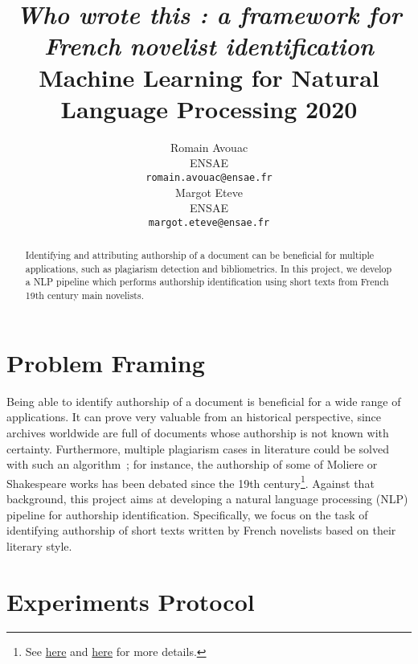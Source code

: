 \documentclass[11pt,a4paper]{article}
\title{\textit{Who wrote this : a framework for French novelist identification} \\
Machine Learning for Natural Language Processing 2020}
\author{Romain Avouac \\
  ENSAE  \\
  \texttt{romain.avouac@ensae.fr} \\\And
  Margot Eteve \\
  ENSAE \\
  \texttt{margot.eteve@ensae.fr} \\}
\date{}
\begin{document}
\maketitle



\begin{abstract}
Identifying and attributing authorship of a document can be beneficial for multiple applications, such as plagiarism detection and bibliometrics. In this project, we develop a NLP pipeline which performs authorship identification using short texts from French 19th century main novelists.
\end{abstract}

\section{Problem Framing}

Being able to identify authorship of a document is beneficial for a wide range of applications. It can prove very valuable from an historical perspective, since archives worldwide are full of documents whose authorship is not known with certainty. Furthermore, multiple plagiarism cases in literature could be solved with such an algorithm~; for instance, the authorship of some of Moliere or Shakespeare works has been debated since the 19th century\footnote{See \href{https://fr.wikipedia.org/wiki/Paternit\%C3\%A9\_des\_\%C5\%93uvres_de_Moli\%C3\%A8re}{here} and \href{https://fr.wikipedia.org/wiki/Paternit\%C3\%A9\_des\_\%C5\%93uvres\_de\_Shakespeare}{here} for more details.}. Against that background, this project aims at developing a natural language processing (NLP) pipeline for authorship identification. Specifically, we focus on the task of identifying authorship of short texts written by French novelists based on their literary style.

\section{Experiments Protocol}
\end{document}

